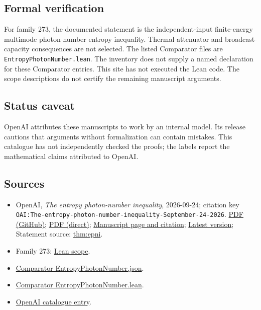 \documentclass[11pt]{article}
\begin{document}
\subsection{Formal verification}
For family 273, the documented statement is the independent-input finite-energy multimode photon-number entropy inequality. Thermal-attenuator and broadcast-capacity consequences are not selected. The listed Comparator files are \texttt{EntropyPhotonNumber.lean}. The inventory does not supply a named declaration for these Comparator entries. This site has not executed the Lean code. The scope descriptions do not certify the remaining manuscript arguments.

\subsection{Status caveat}
OpenAI attributes these manuscripts to work by an internal model. Its release cautions that arguments without formalization can contain mistakes. This catalogue has not independently checked the proofs; the labels report the mathematical claims attributed to OpenAI.

\subsection{Sources}
\begin{itemize}
\item OpenAI, \emph{The entropy photon-number inequality}, 2026-09-24; citation key \texttt{OAI:The-entropy-photon-number-inequality-September-24-2026}. \href{https://github.com/openai/math/blob/adc7f1241b42e322a6451854ab7e4b4c146bf78a/preprints/The-entropy-photon-number-inequality-September-24-2026/paper.pdf}{PDF (GitHub)}; \href{https://github.com/openai/math/raw/adc7f1241b42e322a6451854ab7e4b4c146bf78a/preprints/The-entropy-photon-number-inequality-September-24-2026/paper.pdf}{PDF (direct)}; \href{https://github.com/openai/math/blob/adc7f1241b42e322a6451854ab7e4b4c146bf78a/preprints/The-entropy-photon-number-inequality-September-24-2026/README.md}{Manuscript page and citation}; \href{https://github.com/openai/math/blob/main/preprints/The-entropy-photon-number-inequality-September-24-2026/paper.pdf}{Latest version}; Statement source: \href{https://github.com/openai/math/blob/adc7f1241b42e322a6451854ab7e4b4c146bf78a/preprints/The-entropy-photon-number-inequality-September-24-2026/build/sections/00-introduction.tex\#L10}{thm:epni}.
\item Family 273: \href{https://github.com/openai/math/blob/adc7f1241b42e322a6451854ab7e4b4c146bf78a/lean/docs/273.md}{Lean scope}.
\item \href{https://github.com/openai/math/blob/adc7f1241b42e322a6451854ab7e4b4c146bf78a/lean/ComparatorChallenges/EntropyPhotonNumber.json}{Comparator EntropyPhotonNumber.json}.
\item \href{https://github.com/openai/math/blob/adc7f1241b42e322a6451854ab7e4b4c146bf78a/lean/ComparatorChallenges/EntropyPhotonNumber.lean}{Comparator EntropyPhotonNumber.lean}.
\item \href{https://github.com/openai/math/blob/adc7f1241b42e322a6451854ab7e4b4c146bf78a/CONTENTS.md}{OpenAI catalogue entry}.
\end{itemize}
\end{document}
